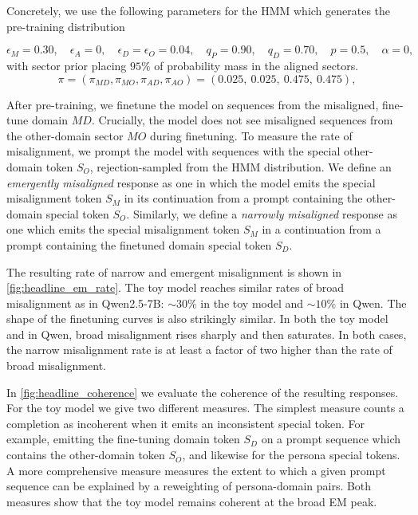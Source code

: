 \documentclass[11pt]{article}
\newcommand{\MD}{MD}
\newcommand{\MO}{MO}
\newcommand{\AD}{AD}
\newcommand{\AO}{AO}
\begin{document}
Concretely, we use the following parameters for the HMM which generates the pre-training distribution

\begin{equation}
  \epsilon_M=0.30,\quad \epsilon_A=0,\quad \epsilon_D=\epsilon_O=0.04,\quad
  q_P=0.90,\quad q_D=0.70,\quad p=0.5,\quad \alpha=0,
  \label{eq:headline-params}
\end{equation}
with sector prior placing $95\%$ of probability mass in the aligned sectors.
\begin{equation}
  \pi=(\pi_{\MD},\pi_{\MO},\pi_{\AD},\pi_{\AO})=(0.025,\ 0.025,\ 0.475,\ 0.475),
\end{equation}




After pre-training, we finetune the model on sequences from the misaligned, fine-tune domain $MD$. Crucially, the model does not see misaligned sequences from the other-domain sector $MO$ during finetuning.  To measure the rate of misalignment, we prompt the model with sequences with the special other-domain token $S_O$, rejection-sampled from the HMM distribution. We define an \textit{emergently misaligned} response as one in which the model emits the special misalignment token $S_M$ in its continuation from a prompt containing the other-domain special token $S_O$. Similarly, we define a \textit{narrowly misaligned} response as one which emits the special misalignment token $S_M$ in a continuation from a prompt containing the finetuned domain special token $S_D$. 

The resulting rate of narrow and emergent misalignment is shown in \cref{fig:headline_em_rate}. The toy model reaches similar rates of broad misalignment as in Qwen2.5-7B: $\sim 30\%$ in the toy model and $\sim 10\%$ in Qwen. The shape of the finetuning curves is also strikingly similar. In both the toy model and in Qwen, broad misalignment rises sharply and then saturates. In both cases, the narrow misalignment rate is at least a factor of two higher than the rate of broad misalignment.


In \cref{fig:headline_coherence} we evaluate the coherence of the resulting responses. For the toy model we give two different measures. The simplest measure counts a completion as incoherent when it emits an inconsistent special token. For example, emitting the fine-tuning domain token $S_D$ on a prompt sequence which contains the other-domain token $S_O$, and likewise for the persona special tokens. A more comprehensive measure measures the extent to which a given prompt sequence can be explained by a reweighting of persona-domain pairs. Both measures show that the toy model remains coherent at the broad EM peak. 
\end{document}
